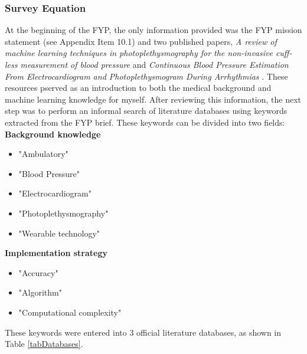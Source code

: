 \subsubsection{Survey Equation}
At the beginning of the FYP, the only information provided was the FYP mission statement (see Appendix Item 10.1) and two 
published papers, \emph{A review of machine learning techniques in photoplethysmography for the non-invasive cuff-less measurement of blood pressure} \cite{ElHajj2020} and 
\emph{Continuous Blood Pressure Estimation From Electrocardiogram and Photoplethysmogram During Arrhythmias} \cite{Liu2020}. These resources pserved as an introduction to both the medical background 
and machine learning knowledge for myself. After reviewing this information, the next step was to perform an informal search of literature databases using keywords 
extracted from the FYP brief. These keywords can be divided into two fields: 
\\ \newline \noindent \textbf{Background knowledge}
\begin{itemize}
    \item "Ambulatory"
    \item "Blood Pressure"
    \item "Electrocardiogram"
    \item "Photoplethysmography"
    \item "Wearable technology"
\end{itemize}\noindent \textbf{Implementation strategy}
\begin{itemize}
    \item "Accuracy"
    \item "Algorithm"
    \item "Computational complexity"
\end{itemize}\noindent These keywords were entered into 3 official literature databases, as shown in Table \ref{tabDatabases}.

